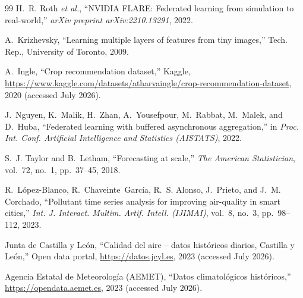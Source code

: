 ﻿\documentclass[journal]{IEEEtran}
\begin{document}
\begin{thebibliography}{99}
H.~R. Roth \emph{et al.},
``NVIDIA FLARE: Federated learning from simulation to real-world,''
\emph{arXiv preprint arXiv:2210.13291}, 2022.

A.~Krizhevsky,
``Learning multiple layers of features from tiny images,''
Tech. Rep., University of Toronto, 2009.

A.~Ingle,
``Crop recommendation dataset,''
Kaggle, \url{https://www.kaggle.com/datasets/atharvaingle/crop-recommendation-dataset}, 2020 (accessed July 2026).

J.~Nguyen, K.~Malik, H.~Zhan, A.~Yousefpour, M.~Rabbat, M.~Malek, and D.~Huba,
``Federated learning with buffered asynchronous aggregation,''
in \emph{Proc. Int. Conf. Artificial Intelligence and Statistics (AISTATS)}, 2022.

S.~J. Taylor and B.~Letham,
``Forecasting at scale,''
\emph{The American Statistician}, vol.~72, no.~1, pp.~37--45, 2018.

R.~L\'opez-Blanco, R.~Chaveinte~Garc\'ia, R.~S. Alonso, J.~Prieto, and J.~M. Corchado,
``Pollutant time series analysis for improving air-quality in smart cities,''
\emph{Int. J. Interact. Multim. Artif. Intell. (IJIMAI)}, vol.~8, no.~3, pp.~98--112, 2023.

Junta de Castilla y Le\'on,
``Calidad del aire -- datos hist\'oricos diarios, Castilla y Le\'on,''
Open data portal, \url{https://datos.jcyl.es}, 2023 (accessed July 2026).

Agencia Estatal de Meteorolog\'ia (AEMET),
``Datos climatol\'ogicos hist\'oricos,''
\url{https://opendata.aemet.es}, 2023 (accessed July 2026).

\end{thebibliography}
\end{document}
